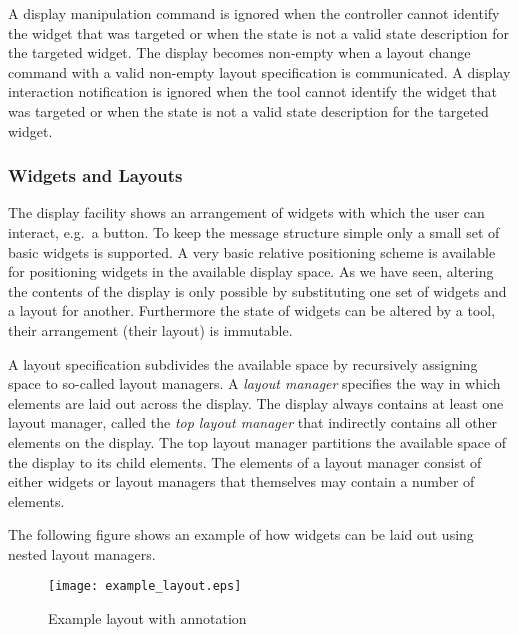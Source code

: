 \documentclass{article}
\begin{document}
   \noindent A display manipulation command is ignored when the controller
   cannot identify the widget that was targeted or when the state is not a
   valid state description for the targeted widget. The display becomes
   non-empty when a layout change command with a valid non-empty layout
   specification is communicated.  A display interaction notification is
   ignored when the tool cannot identify the widget that was targeted or when
   the state is not a valid state description for the targeted widget.

   \subsubsection*{Widgets and Layouts} \label{subsection:widgets_and_layout}

    The display facility shows an arrangement of widgets with which the user
    can interact, e.g.\ a button. To keep the message structure simple only a
    small set of basic widgets is supported. A very basic relative positioning
    scheme is available for positioning widgets in the available display space.
    As we have seen, altering the contents of the display is only possible by
    substituting one set of widgets and a layout for another.  Furthermore the
    state of widgets can be altered by a tool, their arrangement (their layout)
    is immutable.

    A layout specification subdivides the available space by recursively
    assigning space to so-called layout managers. A \textit{layout manager}
    specifies the way in which elements are laid out across the display. The
    display always contains at least one layout manager, called the \textit{top
    layout manager} that indirectly contains all other elements on the display.
    The top layout manager partitions the available space of the display to its
    child elements. The elements of a layout manager consist of either widgets
    or layout managers that themselves may contain a number of elements.

    The following figure shows an example of how widgets can be laid out
    using nested layout managers.

    \begin{figure}[H]
     \begin{center}
      \texttt{[image: example\_layout.eps]}
     \end{center}
     \caption{Example layout with annotation}
     \label{figure:example_layout}
    \end{figure}
\end{document}
